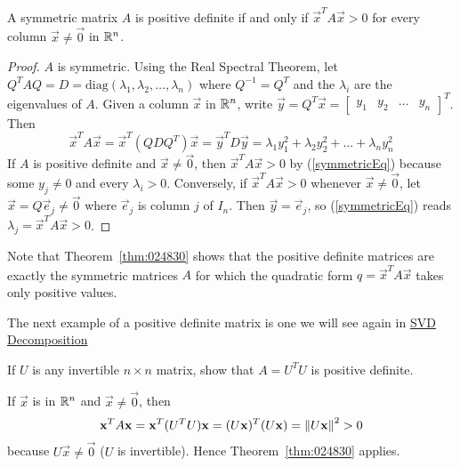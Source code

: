 \documentclass{ximera}
\begin{document}
\begin{theorem}\label{thm:024830}
A symmetric matrix $A$ is positive definite if and only if $\vec{x}^{T} A \vec{x} > 0$ for every column $\vec{x} \neq \vec{0}$ in $\mathbb{R}^n$.
\end{theorem}

\begin{proof}
$A$ is symmetric.  Using  the Real Spectral Theorem, let $Q^{T}AQ = D = \mbox{diag}(\lambda_{1}, \lambda_{2}, \dots, \lambda_{n})$ where $Q^{-1} = Q^{T}$ and the $\lambda_{i}$ are the eigenvalues of $A$. Given a column $\vec{x}$ in $\mathbb{R}^n$, write $\vec{y} = Q^{T}\vec{x} = \left[ \begin{array}{cccc}
y_{1} & y_{2} & \dots & y_{n}
\end{array}\right]^T$. Then
\begin{equation} \label{symmetricEq}
\vec{x}^TA\vec{x} = \vec{x}^T(QDQ^T)\vec{x} = \vec{y}^TD\vec{y} = \lambda_{1}y_{1}^2 + \lambda_{2}y_{2}^2 + \dots + \lambda_{n}y_{n}^2
\end{equation}
If $A$ is positive definite and $\vec{x} \neq \vec{0}$, then $\vec{x}^{T}A\vec{x} > 0$ by (\ref{symmetricEq}) because some $y_{j} \neq 0$ and every $\lambda_{i} > 0$. Conversely, if $\vec{x}^{T}A\vec{x} > 0$ whenever $\vec{x} \neq \vec{0}$, let $\vec{x} = Q\vec{e}_{j} \neq \vec{0}$ where $\vec{e}_{j}$ is column $j$ of $I_{n}$. Then $\vec{y} = \vec{e}_{j}$, so (\ref{symmetricEq}) reads $\lambda_{j} = \vec{x}^{T}A\vec{x} > 0$.
\end{proof}

Note that Theorem~\ref{thm:024830} shows that the positive definite matrices are exactly the symmetric matrices $A$ for which the quadratic form $q = \vec{x}^{T}A\vec{x}$ takes only positive values.  

The next example of a positive definite matrix is one we will see again in \href{https://ximera.osu.edu/linearalgebradzv3/LinearAlgebraInteractiveIntro/RTH-0060/main}{SVD Decomposition}

\begin{example}\label{exa:024865}
If $U$ is any invertible $n \times n$ matrix, show that $A = U^{T}U$ is positive definite.


\begin{explanation}
  If $\vec{x}$ is in $\mathbb{R}^n$ and $\vec{x} \neq \vec{0}$, then
\begin{equation*}
\mathbf{x}^TA\mathbf{x} =  \mathbf{x}^T(U^TU)\mathbf{x} = (U\mathbf{x})^T(U\mathbf{x})= \left\lVert U\mathbf{x} \right\rVert^2 > 0
\end{equation*}
because $U\vec{x} \neq \vec{0}$ ($U$ is invertible). Hence Theorem~\ref{thm:024830} applies.
\end{explanation}
\end{example}
\end{document}
